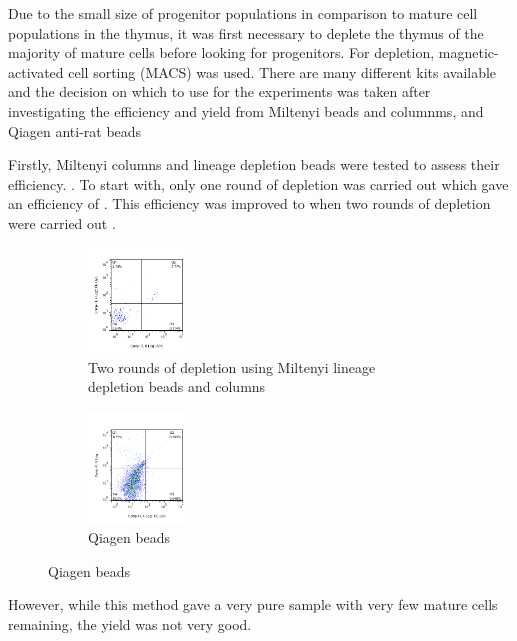 Due to the small size of progenitor populations in comparison to mature cell populations in the thymus, it was first necessary to deplete the thymus of the majority of mature cells before looking for progenitors.
For depletion, magnetic-activated cell sorting (MACS) was used.
There are many different kits available and the decision on which to use for the experiments was taken after investigating the efficiency and yield from Miltenyi beads and columnms, and Qiagen anti-rat beads 

Firstly, Miltenyi columns and lineage depletion beads were tested to assess their efficiency. 
.
To start with, only one round of depletion was carried out which gave an efficiency of .
This efficiency was improved to  when two rounds of depletion were carried out . 
\begin{figure}
	\begin{subfigure}{\textwidth}
	\includegraphics[width=0.3\textwidth]{Figures/2rounddepletion.png}
	\caption[width=0.3\textwidth]{Two rounds of depletion using Miltenyi lineage depletion beads and columns}
	\end{subfigure}
	\hfill
	\begin{subfigure}{\textwidth}
	\includegraphics[width=0.3\textwidth] {Figures/Qiagenbeads.png}
	\caption{Qiagen beads}
	\end{subfigure}
\end{figure}
However, while this method gave a very pure sample with very few mature cells remaining, the yield was not very good.

